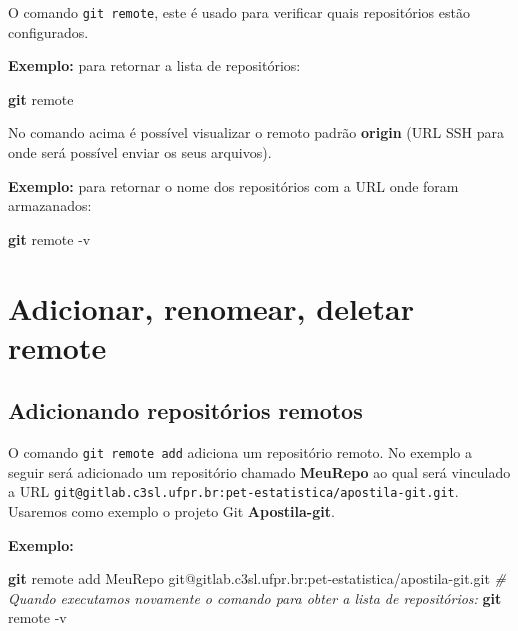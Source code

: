 \documentclass[
  a5paper,
  pagesize,
  9pt,
  pointlessnumbers,
  normalheadings,
  twoside=false
]{book}
\newenvironment{Shaded}{\begin{snugshade}}{\end{snugshade}}
\newcommand{\KeywordTok}[1]{\textcolor[rgb]{0.13,0.29,0.53}{\textbf{{#1}}}}
\newcommand{\CommentTok}[1]{\textcolor[rgb]{0.56,0.35,0.01}{\textit{{#1}}}}
\newcommand{\NormalTok}[1]{{#1}}
\begin{document}
O comando \texttt{git remote}, este é usado para verificar quais
repositórios estão configurados.

\textbf{Exemplo:} para retornar a lista de repositórios:

\begin{Shaded}
\begin{Highlighting}[]
\KeywordTok{git} \NormalTok{remote}
\end{Highlighting}
\end{Shaded}

No comando acima é possível visualizar o remoto padrão \textbf{origin}
(URL SSH para onde será possível enviar os seus arquivos).

\textbf{Exemplo:} para retornar o nome dos repositórios com a URL onde
foram armazanados:

\begin{Shaded}
\begin{Highlighting}[]
\KeywordTok{git} \NormalTok{remote -v}
\end{Highlighting}
\end{Shaded}

\section{Adicionar, renomear, deletar
remote}\label{adicionar-renomear-deletar-remote}

\subsection{Adicionando repositórios
remotos}\label{adicionando-repositorios-remotos}

O comando \texttt{git remote add} adiciona um repositório remoto. No
exemplo a seguir será adicionado um repositório chamado \textbf{MeuRepo}
ao qual será vinculado a URL
\texttt{git@gitlab.c3sl.ufpr.br:pet-estatistica/apostila-git.git}.
Usaremos como exemplo o projeto Git \textbf{Apostila-git}.

\textbf{Exemplo:}

\begin{Shaded}
\begin{Highlighting}[]
\KeywordTok{git} \NormalTok{remote add MeuRepo git@gitlab.c3sl.ufpr.br:pet-estatistica/apostila-git.git}
\CommentTok{# Quando executamos novamente o comando para obter a lista de repositórios:}
\KeywordTok{git} \NormalTok{remote -v}
\end{Highlighting}
\end{Shaded}
\end{document}
